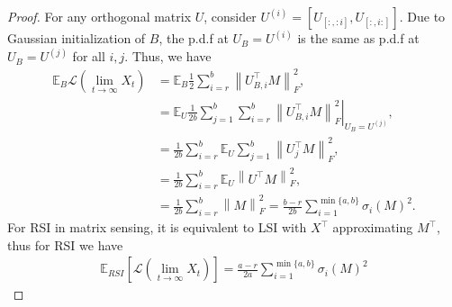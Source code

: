 \begin{proof}
    For any orthogonal matrix $U$, consider $U^{(i)}=[U_{[:,:i]},U_{[:,i:]}]$. 
    Due to Gaussian initialization of $B$, the p.d.f at $U_B=U^{(i)}$ is the same as p.d.f at $U_B=U^{(j)}$ for all $i, j$. Thus, we have
    \begin{align}
        \mathbb{E}_B\mathcal{L}(\lim_{t\to\infty}X_t)&=
        \mathbb{E}_B\frac{1}{2}\sum_{i=r}^{b}\left\|U_{B,i}^\top M\right\|_F^2,\\
        &=\mathbb{E}_U\left.\frac{1}{2b}\sum_{j=1}^b \sum_{i=r}^{b}\left\|U_{B,i}^\top M\right\|_F^2\right|_{U_B=U^{(j)}},\\
        &=\frac{1}{2b}\sum_{i=r}^{b}\mathbb{E}_U\sum_{j=1}^b\left\|U_{j}^\top M\right\|_F^2,\\
        &=\frac{1}{2b}\sum_{i=r}^{b}\mathbb{E}_U\left\|U^\top M\right\|_F^2,\\
        &=\frac{1}{2b}\sum_{i=r}^{b}\left\|M\right\|_F^2=\frac{b-r}{2b}\sum_{i=1}^{\min\{a,b\}}\sigma_i(M)^2.
    \end{align}
    For RSI in matrix sensing, it is equivalent to LSI with $X^\top$ approximating $M^\top$, thus for RSI we have
    \begin{align}
        \mathbb{E}_{RSI}\left[\mathcal{L}(\lim_{t\to\infty}X_t)\right]=\frac{a-r}{2a}\sum_{i=1}^{\min\{a,b\}}\sigma_i(M)^2
    \end{align}
\end{proof}

